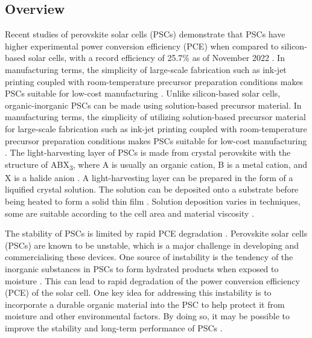 \subsection{Overview}
Recent studies of perovskite solar cells (PSCs) demonstrate that PSCs have higher experimental power conversion efficiency (PCE) when compared to silicon-based solar cells, with a record efficiency of 25.7\% as of November 2022 \cite{sharma_stability_2022, zhang_review_2022, basumatary_short_2022}. In manufacturing terms, the simplicity of large-scale fabrication such as ink-jet printing coupled with room-temperature precursor preparation conditions makes PSCs suitable for low-cost manufacturing \cite{rong_toward_2018, li_cost_2018, ahangharnejhad_impact_2022}. Unlike silicon-based solar cells, organic-inorganic PSCs can be made using solution-based precursor material. In manufacturing terms, the simplicity of utilizing solution-based precursor material for large-scale fabrication such as ink-jet printing coupled with room-temperature precursor preparation conditions makes PSCs suitable for low-cost manufacturing \cite{rong_toward_2018, li_cost_2018, ahangharnejhad_impact_2022}. The light-harvesting layer of PSCs is made from crystal perovskite with the structure of ABX\textsubscript{3}, where A is usually an organic cation, B is a metal cation, and X is a halide anion \cite{mahmud_origin_2022, correa-baena_promises_2017}. A light-harvesting layer can be prepared in the form of a liquified crystal solution. The solution can be deposited onto a substrate before being heated to form a solid thin film \cite{seok_methodologies_2018}. Solution deposition varies in techniques, some are suitable according to the cell area and material viscosity \cite{rong_toward_2018}. \par
The stability of PSCs is limited by rapid PCE degradation \cite{sharma_stability_2022, mahmud_origin_2022, seok_methodologies_2018, pean_investigating_2020, chen_synergistic_2019}. Perovskite solar cells (PSCs) are known to be unstable, which is a major challenge in developing and commercialising these devices. One source of instability is the tendency of the inorganic substances in PSCs to form hydrated products when exposed to moisture \cite{correa-baena_promises_2017, chen_synergistic_2019, cho_mixed_2018}. This can lead to rapid degradation of the power conversion efficiency (PCE) of the solar cell. One key idea for addressing this instability is to incorporate a durable organic material into the PSC to help protect it from moisture and other environmental factors. By doing so, it may be possible to improve the stability and long-term performance of PSCs \cite{seok_methodologies_2018, maafa_all-inorganic_2022}. \par
